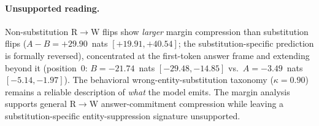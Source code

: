 \documentclass{article}
\begin{document}
\paragraph{Unsupported reading.}
Non-substitution R$\to$W flips show \emph{larger} margin compression than substitution flips ($A - B = +29.90$~nats $[+19.91, +40.54]$; the substitution-specific prediction is formally reversed), concentrated at the first-token answer frame and extending beyond it (position~0: $B = -21.74$~nats $[-29.48, -14.85]$ vs.\ $A = -3.49$~nats $[-5.14, -1.97]$).
The behavioral wrong-entity-substitution taxonomy ($\kappa = 0.90$) remains a reliable description of \emph{what} the model emits.
The margin analysis supports general R$\to$W answer-commitment compression while leaving a substitution-specific entity-suppression signature unsupported.
\FloatBarrier
\end{document}
